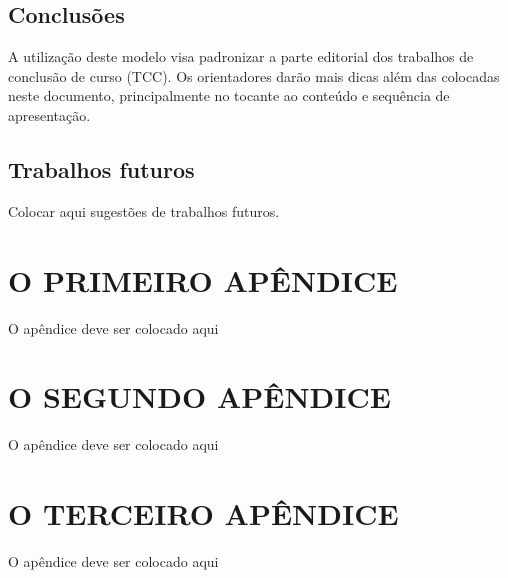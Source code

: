 \documentclass[
        oneside,      %
        english,			
        brazil			 
        ]{configcefetmglpd}
\begin{document}
\section{Conclusões}
A utilização deste modelo visa padronizar a parte editorial dos trabalhos de conclusão de curso (TCC). Os orientadores darão mais dicas além das colocadas neste documento, principalmente no tocante ao conteúdo e sequência de apresentação.

\section{Trabalhos futuros}
Colocar aqui sugestões de trabalhos futuros.


\postextual 





\begin{apendices}

\chapter{\apendseq O PRIMEIRO APÊNDICE} 

O apêndice deve ser colocado aqui


\chapter{\apendseq O SEGUNDO APÊNDICE} 

O apêndice deve ser colocado aqui 


\chapter{\apendseq O TERCEIRO APÊNDICE} 

O apêndice deve ser colocado aqui 


\end{apendices}
\end{document}
